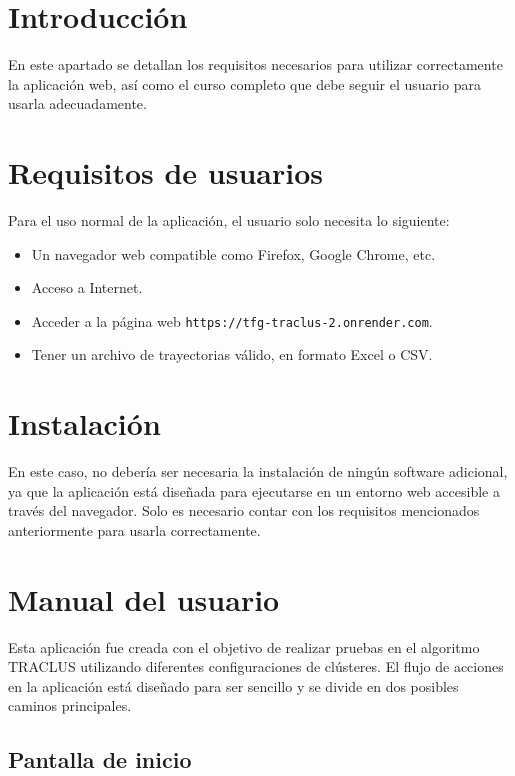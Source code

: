 
\section{Introducción}

En este apartado se detallan los requisitos necesarios para utilizar correctamente la aplicación web, así como el curso completo que debe seguir el usuario para usarla adecuadamente.

\section{Requisitos de usuarios}

Para el uso normal de la aplicación, el usuario solo necesita lo siguiente:

\begin{itemize}
    \item Un navegador web compatible como Firefox, Google Chrome, etc.
    \item Acceso a Internet.
    \item Acceder a la página web \texttt{https://tfg-traclus-2.onrender.com}.
    \item Tener un archivo de trayectorias válido, en formato Excel o CSV.
\end{itemize}

\section{Instalación}

En este caso, no debería ser necesaria la instalación de ningún software adicional, ya que la aplicación está diseñada para ejecutarse en un entorno web accesible a través del navegador. Solo es necesario contar con los requisitos mencionados anteriormente para usarla correctamente.

\section{Manual del usuario}

Esta aplicación fue creada con el objetivo de realizar pruebas en el algoritmo TRACLUS utilizando diferentes configuraciones de clústeres. El flujo de acciones en la aplicación está diseñado para ser sencillo y se divide en dos posibles caminos principales.

\subsection{Pantalla de inicio}


